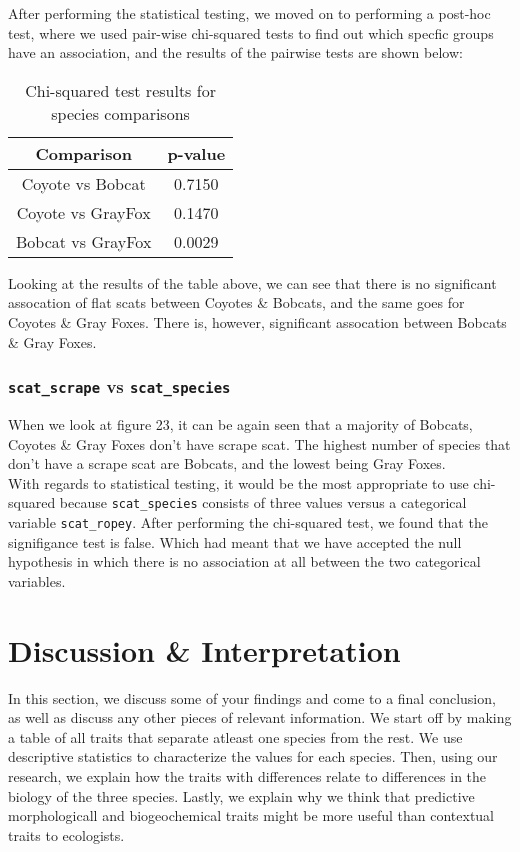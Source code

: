 \documentclass[a4paper]{article}
\begin{document}
\noindent After performing the statistical testing, we moved on to performing a post-hoc test, where we used pair-wise chi-squared tests to find out which
specfic groups have an association, and the results of the pairwise tests are shown below: \\

\begin{table}[h]
    \centering
    \begin{tabular}{|c|c|}
        \hline
        Comparison & p-value \\
        \hline
        Coyote vs Bobcat & 0.7150 \\
        Coyote vs GrayFox & 0.1470 \\
        Bobcat vs GrayFox & 0.0029 \\
        \hline
    \end{tabular}
    \caption{Chi-squared test results for species comparisons}
    \label{tab:chi_squared_results_flat}
\end{table}

\noindent Looking at the results of the table above, we can see that there is no significant assocation of flat scats between Coyotes \& Bobcats, and the same
goes for Coyotes \& Gray Foxes. There is, however, significant assocation between Bobcats \& Gray Foxes. 

\subsubsection{\texttt{scat\_scrape} vs \texttt{scat\_species}}
When we look at figure 23, it can be again seen that a majority of Bobcats, Coyotes \& Gray Foxes don't have scrape scat. The highest number of species that
don't have a scrape scat are Bobcats, and the lowest being Gray Foxes. \\

\noindent With regards to statistical testing, it would be the most appropriate to use chi-squared because \texttt{scat\_species} consists of three values
versus a categorical variable \texttt{scat\_ropey}. After performing the chi-squared test, we found that the signifigance test is false. Which had meant that
we have accepted the null hypothesis in which there is no association at all between the two categorical variables. \\

\newpage

\section{Discussion \& Interpretation}
In this section, we discuss some of your findings and come to a final conclusion, as well as discuss any other pieces of relevant information. We start off
by making a table of all traits that separate atleast one species from the rest. We use descriptive statistics to characterize the values for each species.
Then, using our research, we explain how the traits with differences relate to differences in the biology of the three species. Lastly, we explain why we 
think that predictive morphologicall and biogeochemical traits might be more useful than contextual traits to ecologists.
\end{document}
